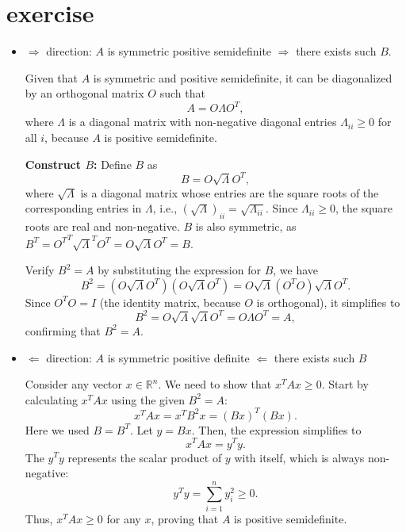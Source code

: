 \documentclass{article}
\begin{document}
\section{exercise}
\begin{itemize}
    \item $\Rightarrow$ direction: \( A \) is symmetric positive semidefinite $\Rightarrow$ there exists such $B$.

          Given that \( A \) is symmetric and positive semidefinite, it can be diagonalized by an orthogonal matrix \( O \) such that
          \[
              A = O \Lambda O^T,
          \]
          where \( \Lambda \) is a diagonal matrix with non-negative diagonal entries \( \Lambda_{ii} \geq 0 \) for all \( i \), because \( A \) is positive semidefinite.

          \textbf{Construct \( B \):}
          Define \( B \) as
          \[
              B = O \sqrt{\Lambda} O^T,
          \]
          where \( \sqrt{\Lambda} \) is a diagonal matrix whose entries are
          the square roots of the corresponding entries in \( \Lambda \),
          i.e., \( (\sqrt{\Lambda})_{ii} = \sqrt{\Lambda_{ii}} \).
          Since \( \Lambda_{ii} \geq 0 \),
          the square roots are real and non-negative.
          $B$ is also symmetric,
          as $B^T = {O^T}^T \sqrt{\Lambda}^T O^T=O \sqrt{\Lambda} O^T =B$.

          Verify \( B^2 = A \) by substituting the expression for \( B \), we have
          \[
              B^2 = (O \sqrt{\Lambda} O^T)(O \sqrt{\Lambda} O^T) = O \sqrt{\Lambda} (O^T O) \sqrt{\Lambda} O^T.
          \]
          Since \( O^T O = I \) (the identity matrix, because \( O \) is orthogonal),
          it simplifies to
          \[
              B^2 = O \sqrt{\Lambda} \sqrt{\Lambda} O^T = O \Lambda O^T = A,
          \]
          confirming that \( B^2 = A \).
    \item $\Leftarrow$ direction: $A$ is symmetric positive definite $\Leftarrow$ there exists such \( B \)

          Consider any vector \( x \in \mathbb{R}^n \).
          We need to show that \( x^T A x \geq 0 \).
          Start by calculating \( x^T A x \) using the given \( B^2 = A \):
          \[
              x^T A x = x^T B^2 x = (Bx)^T (Bx).
          \]
          Here we used $B = B^T$. Let \( y = Bx \). Then, the expression simplifies to
          \[
              x^T A x = y^T y.
          \]
          The \( y^T y \) represents the scalar product of \( y \) with itself,
          which is always non-negative:
          \[
              y^T y = \sum_{i=1}^n y_i^2 \geq 0.
          \]
          Thus, \( x^T A x \geq 0 \) for any \( x \),
          proving that \( A \) is positive semidefinite.
\end{itemize}
\end{document}
